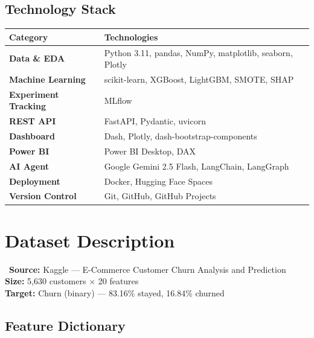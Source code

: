 \documentclass[11pt,a4paper]{article}
\begin{document}
\subsection{Technology Stack}

\begin{table}[H]
\centering
{}
\begin{tabularx}{\textwidth}{>{\bfseries\color{primary}}l X}
\toprule
\textbf{\color{darktext}Category} & \textbf{\color{darktext}Technologies} \\
\midrule
Data \& EDA & Python 3.11, pandas, NumPy, matplotlib, seaborn, Plotly \\
Machine Learning & scikit-learn, XGBoost, LightGBM, SMOTE, SHAP \\
Experiment Tracking & MLflow \\
REST API & FastAPI, Pydantic, uvicorn \\
Dashboard & Dash, Plotly, dash-bootstrap-components \\
Power BI & Power BI Desktop, DAX \\
AI Agent & Google Gemini 2.5 Flash, LangChain, LangGraph \\
Deployment & Docker, Hugging Face Spaces \\
Version Control & Git, GitHub, GitHub Projects \\
\bottomrule
\end{tabularx}
\end{table}

\section{Dataset Description}

\begin{infobox}
\faDatabase\ \textbf{Source:} Kaggle --- E-Commerce Customer Churn Analysis and Prediction\\
\textbf{Size:} 5,630 customers $\times$ 20 features\\
\textbf{Target:} Churn (binary) --- 83.16\% stayed, \textcolor{accent}{16.84\% churned}
\end{infobox}

\subsection{Feature Dictionary}
\end{document}
